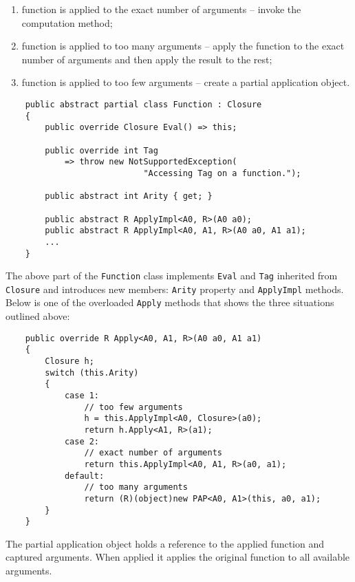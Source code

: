 \documentclass[en]{pracamgr}
\begin{document}
\begin{enumerate}
    \item function is applied to the exact number of arguments
    -- invoke the computation method;
    \item function is applied to too many arguments
    -- apply the function to the exact number of arguments
    and then apply the result to the rest;
    \item function is applied to too few arguments 
    -- create a partial application object.
\end{enumerate}

\begin{verbatim}
    public abstract partial class Function : Closure
    {
        public override Closure Eval() => this;

        public override int Tag
            => throw new NotSupportedException(
                            "Accessing Tag on a function.");
        
        public abstract int Arity { get; }
            
        public abstract R ApplyImpl<A0, R>(A0 a0);
        public abstract R ApplyImpl<A0, A1, R>(A0 a0, A1 a1);
        ...
    }
\end{verbatim}

The above part of the \texttt{Function} class implements \texttt{Eval}
and \texttt{Tag} inherited from \texttt{Closure} and introduces
new members: \texttt{Arity} property and \texttt{ApplyImpl} methods.
Below is one of the overloaded \texttt{Apply} methods that shows
the three situations outlined above:

\begin{verbatim}
    public override R Apply<A0, A1, R>(A0 a0, A1 a1)
    {
        Closure h;
        switch (this.Arity)
        {
            case 1:
                // too few arguments
                h = this.ApplyImpl<A0, Closure>(a0);
                return h.Apply<A1, R>(a1);
            case 2:
                // exact number of arguments
                return this.ApplyImpl<A0, A1, R>(a0, a1);
            default:
                // too many arguments
                return (R)(object)new PAP<A0, A1>(this, a0, a1);
        }
    }
\end{verbatim}

The partial application object holds a reference to the
applied function and captured arguments.
When applied it applies the original function to all available arguments.
\end{document}
